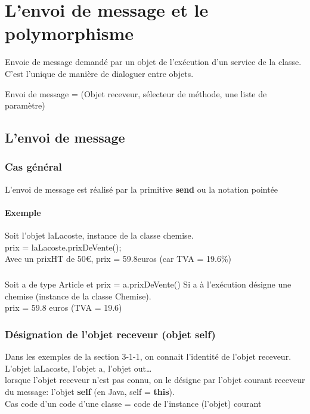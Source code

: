 \chapter{L'envoi de message et le polymorphisme}
Envoie de message demandé par un objet de l'exécution d'un service de la classe. \\
C'est l'unique de manière de dialoguer entre objets.

Envoi de message = (Objet receveur, sélecteur de méthode, une liste de paramètre)

\section{L'envoi de message}
\subsection{Cas général}
L'envoi de message est réalisé par la primitive \textbf{send} ou la notation pointée

\subsubsection{Exemple}
Soit l'objet laLacoste, instance de la classe chemise.\\
prix = laLacoste.prixDeVente();\\
Avec un prixHT de 50\euro{}, prix = 59.8euros (car TVA = 19.6\%)

\paragraph{}Soit a de type Article et prix = a.prixDeVente()
Si a à l'exécution désigne une chemise (instance de la classe Chemise). \\
prix = 59.8 euros (TVA = 19.6)

\subsection{Désignation de l'objet receveur (objet self)}
Dans les exemples de la section 3-1-1, on connait l'identité de l'objet receveur.
L'objet laLacoste, l'objet a, l'objet out\ldots\\
lorsque l'objet receveur n'est pas connu, on le désigne par l'objet courant receveur du message:
l'objet \textbf{self} (en Java, self = \textbf{this}).\\
Cas code d'un code d'une classe = code de l'instance (l'objet) courant

